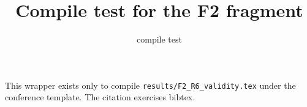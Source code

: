 \documentclass{article}
\title{Compile test for the F2 fragment}
\author{compile test}
\begin{document}
\maketitle

This wrapper exists only to compile \texttt{results/F2\_R6\_validity.tex} under
the conference template. The citation \citep{Hinton06} exercises bibtex.





\end{document}
